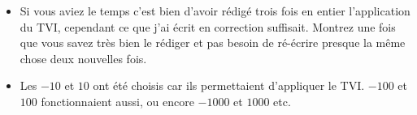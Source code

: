 \documentclass[a4paper,12pt,reqno,french]{article}
\begin{document}
	\begin{rqs}
		
		\begin{itemize}
			
			\item Si vous aviez le temps c'est bien d'avoir rédigé trois fois en entier l'application du TVI, cependant ce que j'ai écrit en correction suffisait. Montrez une fois que vous savez très bien le rédiger et pas besoin de ré-écrire presque la même chose deux nouvelles fois.
			
			\item Les $-10$ et $10$ ont été choisis car ils permettaient d'appliquer le TVI. $-100$ et $100$ fonctionnaient aussi, ou encore $-1000$ et $1000$ etc.
			
		\end{itemize}
		
	\end{rqs}
	
	
	
	
	
	
	
\end{document}
